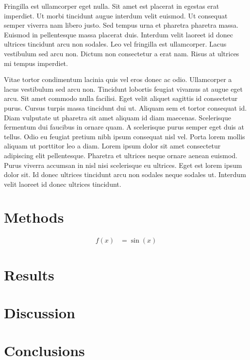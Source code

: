 \documentclass[journal=jctcce,manuscript=article,layout=traditional]{achemso}
\begin{document}
    Fringilla est ullamcorper eget nulla.
    Sit amet est placerat in egestas erat imperdiet.
    Ut morbi tincidunt augue interdum velit euismod.
    Ut consequat semper viverra nam libero justo.
    Sed tempus urna et pharetra pharetra massa.
    Euismod in pellentesque massa placerat duis.
    Interdum velit laoreet id donec ultrices tincidunt arcu non sodales.
    Leo vel fringilla est ullamcorper.
    Lacus vestibulum sed arcu non.
    Dictum non consectetur a erat nam.
    Risus at ultrices mi tempus imperdiet.

    Vitae tortor condimentum lacinia quis vel eros donec ac odio.
    Ullamcorper a lacus vestibulum sed arcu non.
    Tincidunt lobortis feugiat vivamus at augue eget arcu.
    Sit amet commodo nulla facilisi.
    Eget velit aliquet sagittis id consectetur purus.
    Cursus turpis massa tincidunt dui ut.
    Aliquam sem et tortor consequat id.
    Diam vulputate ut pharetra sit amet aliquam id diam maecenas.
    Scelerisque fermentum dui faucibus in ornare quam.
    A scelerisque purus semper eget duis at tellus.
    Odio eu feugiat pretium nibh ipsum consequat nisl vel.
    Porta lorem mollis aliquam ut porttitor leo a diam.
    Lorem ipsum dolor sit amet consectetur adipiscing elit pellentesque.
    Pharetra et ultrices neque ornare aenean euismod.
    Purus viverra accumsan in nisl nisi scelerisque eu ultrices.
    Eget est lorem ipsum dolor sit.
    Id donec ultrices tincidunt arcu non sodales neque sodales ut.
    Interdum velit laoreet id donec ultrices tincidunt.

    \section{Methods}
    \label{sec:methods}

    \begin{align}
        f(x) &= \sin(x)
    \end{align}

    \section{Results}
    \label{sec:results}

    \section{Discussion}
    \label{sec:discussion}

    \section{Conclusions}
    \label{sec:conclusions}
\end{document}
